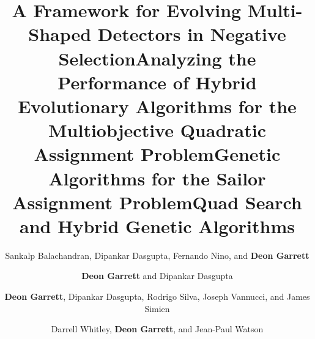 \documentclass[a4paper,10pt]{cvclean}
\begin{document}
\begin{publications}
\begin{conferencepapers}
\begin{paper}
    \end{paper}
    \begin{paper}
      \title{A Framework for Evolving Multi-Shaped Detectors in Negative Selection}
      \author{Sankalp Balachandran, Dipankar Dasgupta, Fernando Nino, and \textbf{Deon
        Garrett}}
    \end{paper}
    \begin{paper}
      \title{Analyzing the Performance of Hybrid Evolutionary Algorithms for the
        Multiobjective Quadratic Assignment Problem}
      \author{\textbf{Deon Garrett} and Dipankar Dasgupta}
    \end{paper}
    \begin{paper}
      \title{Genetic Algorithms for the Sailor Assignment Problem}
      \author{\textbf{Deon Garrett}, Dipankar Dasgupta, Rodrigo Silva, Joseph Vannucci,
        and James Simien}
    \end{paper}
    \begin{paper}
      \title{Quad Search and Hybrid Genetic Algorithms}
      \author{Darrell Whitley, \textbf{Deon Garrett}, and Jean-Paul Watson}
    \end{paper}
  \end{conferencepapers}


\end{publications}
\end{document}
